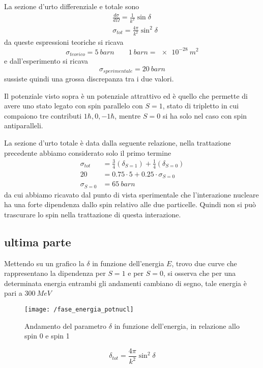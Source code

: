 La sezione d'urto differenziale e totale sono
\begin{equation}
\begin{split}
& \frac{d\sigma}{d\Omega} = \frac{1}{k^2} \sin \delta \\
& \sigma_{tot} = \frac{4\pi}{k^2} \sin^2 \delta
\end{split}
\end{equation}
da queste espressioni teoriche si ricava
\begin{equation}
\sigma_{teorico} = \SI{5}{barn} \quad\quad \SI{1}{barn} = \SI{e-28}{m^2}
\end{equation}
e dall'esperimento si ricava
\begin{equation}
\sigma_{sperimentale} = \SI{20}{barn}
\end{equation}
sussiste quindi una grossa discrepanza tra i due valori. 

Il potenziale visto sopra è un potenziale attrattivo ed è quello che permette di avere uno stato legato con spin parallelo con $S=1$, stato di tripletto in cui compaiono tre contributi $1 \hbar, 0, -1 \hbar$, mentre $S=0$ si ha solo nel caso con spin antiparalleli.

La sezione d'urto totale è data dalla seguente relazione, nella trattazione precedente abbiamo considerato solo il primo termine
\begin{equation}
\begin{split}
\sigma_{tot} & = \frac{3}{4} (\delta_{S=1}) + \frac{1}{4} (\delta_{S=0}) \\
20 & = 0.75 \cdot 5 + 0.25 \cdot \sigma_{S=0} \\
\sigma_{S=0} & = \SI{65}{barn}
\end{split}
\end{equation}
da cui abbiamo ricavato dal punto di vista sperimentale che l'interazione nucleare ha una forte dipendenza dallo spin relativo alle due particelle.
Quindi non si può trascurare lo spin nella trattazione di questa interazione.

\subsection{ultima parte}
Mettendo su un grafico la $\delta$ in funzione dell'energia $E$, trovo due curve che rappresentano la dipendenza per $S = 1$ e per $S = 0$, si osserva che per una determinata energia entrambi gli andamenti cambiano di segno, tale energia è pari a $\SI{300}{MeV}$
\begin{figure}[h]
\centering
\texttt{[image: /fase\_energia\_potnucl]}
\caption{Andamento del parametro $\delta$ in funzione dell'energia, in relazione allo spin 0 e spin 1}
\label{delta_energ}
\end{figure}
\begin{equation}
\delta_{tot} = \frac{4\pi}{k^2} \sin^2 \delta
\end{equation}

